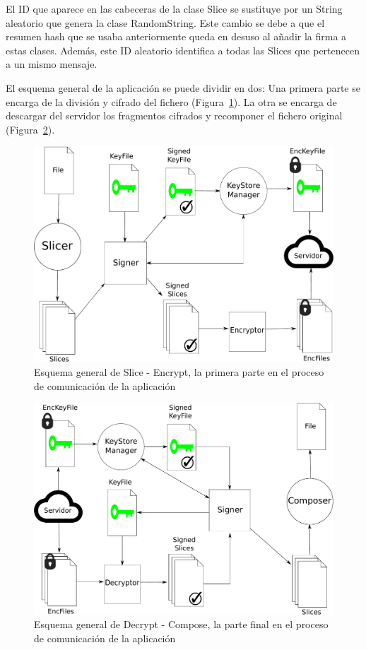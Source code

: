 
El ID que aparece en las cabeceras de la clase Slice se sustituye por un String
aleatorio que genera la clase RandomString. Este cambio se debe a que el resumen
hash que se usaba anteriormente queda en desuso al añadir la firma a estas
clases. Además, este ID aleatorio identifica a todas las Slices que pertenecen
a un mismo mensaje.

El esquema general de la aplicación se puede dividir en dos: Una primera parte
se encarga de la división y cifrado del fichero (Figura~\ref{fig:abstractA}). La
otra se encarga de descargar del servidor los fragmentos cifrados y recomponer
el fichero original (Figura~\ref{fig:abstractB}).

\begin{figure}[ht]
  \centering
  \includegraphics[scale=0.5]{Figures/abstractA}
  \decoRule
  \caption[Slice - Encrypt]{Esquema general de Slice - Encrypt, la primera parte en el proceso de comunicación de la aplicación}
  \label{fig:abstractA}
\end{figure}

\begin{figure}[ht]
  \centering
  \includegraphics[scale=0.5]{Figures/abstractB}
  \decoRule
  \caption[Decrypt - Compose]{Esquema general de Decrypt - Compose, la parte final en el proceso de comunicación de la aplicación}
  \label{fig:abstractB}
\end{figure}

